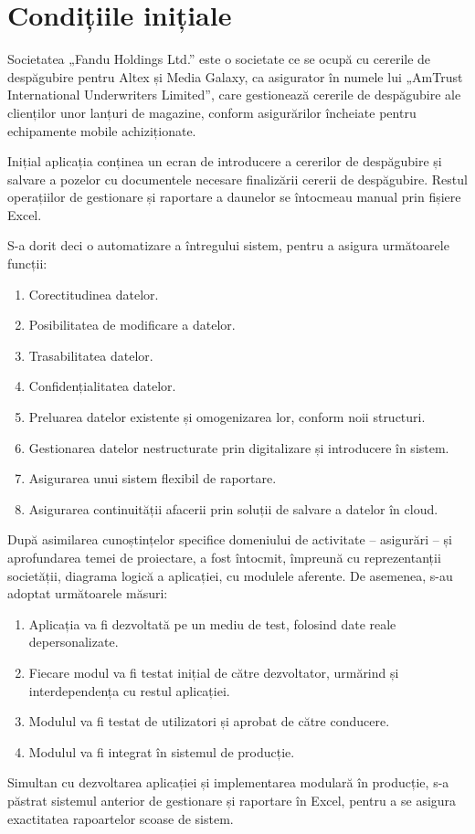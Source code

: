 \section{Condițiile inițiale}

	Societatea „Fandu Holdings Ltd.” este o societate ce se ocupă cu cererile de despăgubire pentru Altex și Media Galaxy\cite{media_galaxy}, ca asigurator în numele lui „AmTrust International Underwriters Limited”, care gestionează cererile de despăgubire ale clienților unor lanțuri de magazine, conform asigurărilor încheiate pentru echipamente mobile achiziționate.

	Inițial aplicația conținea un ecran de introducere a cererilor de despăgubire și salvare a pozelor cu documentele necesare finalizării cererii de despăgubire.
	Restul operațiilor de gestionare și raportare a daunelor se întocmeau manual prin fișiere Excel.

	S-a dorit deci o automatizare a întregului sistem, pentru a asigura următoarele funcții:
	\begin{enumerate}
		\item Corectitudinea datelor.
		\item Posibilitatea de modificare a datelor.
		\item Trasabilitatea datelor.
		\item Confidențialitatea datelor.
		\item Preluarea datelor existente și omogenizarea lor, conform noii structuri.
		\item Gestionarea datelor nestructurate prin digitalizare și introducere în sistem.
		\item Asigurarea unui sistem flexibil de raportare.
		\item Asigurarea continuității afacerii prin soluții de salvare a datelor în cloud.
	\end{enumerate}

	După asimilarea cunoștințelor specifice domeniului de activitate -- asigurări -- și aprofundarea temei de proiectare, a fost întocmit, împreună cu reprezentanții societății, diagrama logică a aplicației, cu modulele aferente.
	De asemenea, s-au adoptat următoarele măsuri:

	\begin{enumerate}
		\item Aplicația va fi dezvoltată pe un mediu de test, folosind date reale depersonalizate.
		\item Fiecare modul va fi testat inițial de către dezvoltator, urmărind și interdependența cu restul aplicației.
		\item Modulul va fi testat de utilizatori și aprobat de către conducere.
		\item Modulul va fi integrat în sistemul de producție.
	\end{enumerate}

	Simultan cu dezvoltarea aplicației și implementarea modulară în producție, s-a păstrat sistemul anterior de gestionare și raportare în Excel, pentru a se asigura exactitatea rapoartelor scoase de sistem.
